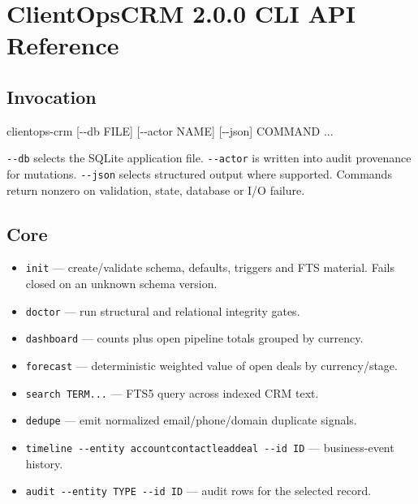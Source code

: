 \documentclass[
]{article}
\author{}
\date{}
\newenvironment{Shaded}{}{}
\newcommand{\NormalTok}[1]{#1}
\providecommand{\tightlist}{%
  \setlength{\itemsep}{0pt}\setlength{\parskip}{0pt}}
\begin{document}
\section{ClientOpsCRM 2.0.0 CLI API
Reference}\label{clientopscrm-200-cli-api-reference}

\subsection{Invocation}\label{invocation}

\begin{Shaded}
\begin{Highlighting}[]
\NormalTok{clientops{-}crm [{-}{-}db FILE] [{-}{-}actor NAME] [{-}{-}json] COMMAND ...}
\end{Highlighting}
\end{Shaded}

\texttt{-\/-db} selects the SQLite application file. \texttt{-\/-actor}
is written into audit provenance for mutations. \texttt{-\/-json}
selects structured output where supported. Commands return nonzero on
validation, state, database or I/O failure.

\subsection{Core}\label{core}

\begin{itemize}
\tightlist
\item
  \texttt{init} --- create/validate schema, defaults, triggers and FTS
  material. Fails closed on an unknown schema version.
\item
  \texttt{doctor} --- run structural and relational integrity gates.
\item
  \texttt{dashboard} --- counts plus open pipeline totals grouped by
  currency.
\item
  \texttt{forecast} --- deterministic weighted value of open deals by
  currency/stage.
\item
  \texttt{search\ TERM...} --- FTS5 query across indexed CRM text.
\item
  \texttt{dedupe} --- emit normalized email/phone/domain duplicate
  signals.
\item
  \texttt{timeline\ -\/-entity\ account\textbar{}contact\textbar{}lead\textbar{}deal\ -\/-id\ ID}
  --- business-event history.
\item
  \texttt{audit\ -\/-entity\ TYPE\ -\/-id\ ID} --- audit rows for the
  selected record.
\end{itemize}
\end{document}
